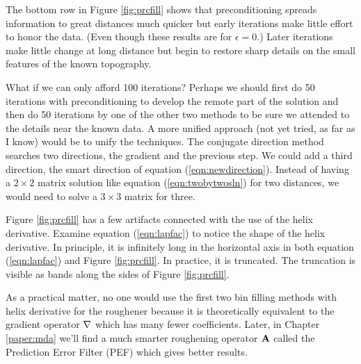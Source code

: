\par
The bottom row in Figure \ref{fig:prcfill} shows that preconditioning
spreads information to great distances much quicker
but early iterations make little effort to honor the data.
(Even though these results are for $\epsilon=0$.)
Later iterations make little change at long distance
but begin to restore sharp details on the small features
of the known topography.

\par
What if we can only afford 100 iterations?
Perhaps we should first do 50 iterations with
preconditioning to develop the remote part of the solution and
then do 50 iterations by one of the other two methods to be sure
we attended to the details near the known data.
A more unified approach (not yet tried, as far as I know)
would be to unify the techniques.
The conjugate direction method searches two directions,
the gradient and the previous step.
We could add a third direction,
the smart direction of equation (\ref{eqn:newdirection}).
Instead of having a $2\times 2$ matrix
solution like equation (\ref{eqn:twobytwosln}) for two distances,
we would need to solve a $3\times 3$ matrix for three.

\par
Figure \ref{fig:prcfill} has a few artifacts connected with the
use of the helix derivative.
Examine equation (\ref{eqn:lapfac}) to notice the shape of the helix derivative.
In principle, it is infinitely long in the horizontal axis
in both equation (\ref{eqn:lapfac}) and Figure \ref{fig:prcfill}.
In practice, it is truncated.  The truncation is visible as bands
along the sides of Figure \ref{fig:prcfill}.

\par
As a practical matter, no one would use the first two bin filling methods
with helix derivative for the roughener
because it is theoretically equivalent to the gradient operator
$\bold \nabla$ which has many fewer coefficients.
Later, in Chapter
\ref{paper:mda}
we'll find a much smarter roughening operator $\bold A$
called the Prediction Error Filter (PEF)
which gives better results.







